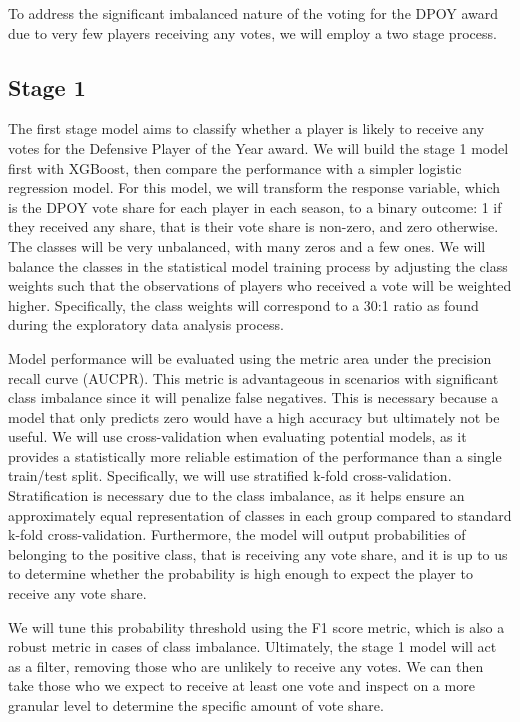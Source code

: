 \documentclass[letterpaper,titlepage]{article}
\begin{document}
    To address the significant imbalanced nature of the voting for the DPOY award due to very few players receiving any votes, we will employ a two stage process.

    \subsection{Stage 1}
    The first stage model aims to classify whether a player is likely to receive any votes for the Defensive Player of the Year award. We will build the stage 1 model first with XGBoost, then compare the performance with a simpler logistic regression model. For this model, we will transform the response variable, which is the DPOY vote share for each player in each season, to a binary outcome: 1 if they received any share, that is their vote share is non-zero, and zero otherwise. The classes will be very unbalanced, with many zeros and a few ones. We will balance the classes in the statistical model training process by adjusting the class weights such that the observations of players who received a vote will be weighted higher. Specifically, the class weights will correspond to a 30:1 ratio as found during the exploratory data analysis process. 
    
    Model performance will be evaluated using the metric area under the precision recall curve (AUCPR). This metric is advantageous in scenarios with significant class imbalance since it will penalize false negatives. This is necessary because a model that only predicts zero would have a high accuracy but ultimately not be useful. We will use cross-validation when evaluating potential models, as it provides a statistically more reliable estimation of the performance than a single train/test split. Specifically, we will use stratified k-fold cross-validation. Stratification is necessary due to the class imbalance, as it helps ensure an approximately equal representation of classes in each group compared to standard k-fold cross-validation. Furthermore, the model will output probabilities of belonging to the positive class, that is receiving any vote share, and it is up to us to determine whether the probability is high enough to expect the player to receive any vote share. 
    
    We will tune this probability threshold using the F1 score metric, which is also a robust metric in cases of class imbalance. Ultimately, the stage 1 model will act as a filter, removing those who are unlikely to receive any votes. We can then take those who we expect to receive at least one vote and inspect on a more granular level to determine the specific amount of vote share.
\end{document}
